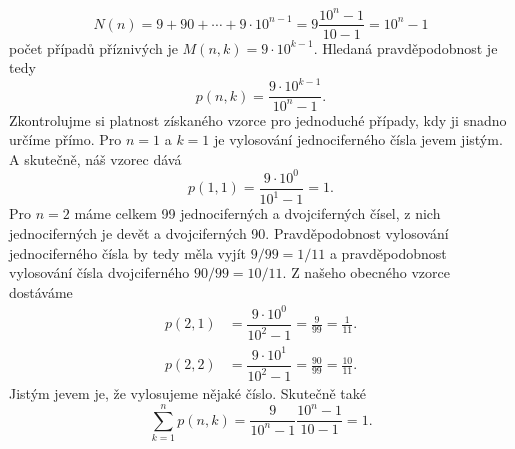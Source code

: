 \begin{mdframed}[style=mdexam]
\begin{example}
\begin{equation*}
      N(n) =9 + 90 + \cdots + 9\cdot10^{n-1} = 9\dfrac{10^n-1}{10 - 1} = 10^n - 1
    \end{equation*}
    počet případů příznivých je  \(M(n,k) = 9\cdot10^{k-1}\). Hledaná pravděpodobnost je tedy
    \begin{equation*}
      p(n,k) = \dfrac{9\cdot10^{k-1}}{10^n-1}.
    \end{equation*}
    Zkontrolujme si platnost získaného vzorce pro jednoduché případy, kdy ji snadno určíme přímo.
    Pro \(n = 1\) a \(k = 1\) je vylosování jednociferného čísla jevem jistým. A skutečně, náš
    vzorec dává
    \begin{equation*}
      p(1,1) = \dfrac{9\cdot10^0}{10^1-1} = 1.
    \end{equation*}
    Pro \(n = 2\) máme celkem \num{99} jednociferných a dvojciferných čísel, z nich jednociferných
    je devět a dvojciferných \num{90}. Pravděpodobnost vylosování jednociferného čísla by tedy měla
    vyjít \(9/99=1/11\) a pravděpodobnost vylosování čísla dvojciferného \(90/99=10/11\). Z našeho
    obecného vzorce dostáváme
    \begin{align*}
      p(2,1) &= \dfrac{9\cdot10^0}{10^2-1} = \frac{9}{99} = \frac{1}{11}. \\
      p(2,2) &= \dfrac{9\cdot10^1}{10^2-1} = \frac{90}{99} = \frac{10}{11}.
    \end{align*}
    Jistým jevem je, že vylosujeme nějaké číslo. Skutečně také
    \begin{equation*}
      \sum_{k=1}^{n}p(n,k) = \dfrac{9}{10^n - 1}\dfrac{10^n - 1}{10 - 1} =1.
    \end{equation*}
  \end{example}
\end{mdframed}